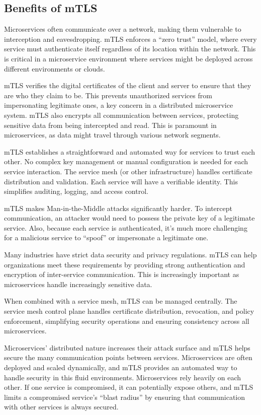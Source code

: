 \subsection{Benefits of mTLS}

Microservices often communicate over a network, making them vulnerable
to interception and eavesdropping. mTLS enforces a ``zero trust'' model,
where every service must authenticate itself regardless of its location
within the network. This is critical in a microservice environment where
services might be deployed across different environments or clouds.

mTLS verifies the digital certificates of the client and server to
ensure that they are who they claim to be. This prevents unauthorized
services from impersonating legitimate ones, a key concern in a
distributed microservice system. mTLS also encrypts all communication
between services, protecting sensitive data from being intercepted and
read. This is paramount in microservices, as data might travel through
various network segments.

mTLS establishes a straightforward and automated way for services to
trust each other. No complex key management or manual configuration is
needed for each service interaction. The service mesh (or other
infrastructure) handles certificate distribution and validation. Each
service will have a verifiable identity. This simplifies auditing,
logging, and access control.

mTLS makes Man-in-the-Middle attacks significantly harder. To intercept
communication, an attacker would need to possess the private key of a
legitimate service. Also, because each service is authenticated, it's
much more challenging for a malicious service to ``spoof'' or impersonate a
legitimate one.

Many industries have strict data security and privacy regulations. mTLS
can help organizations meet these requirements by providing strong
authentication and encryption of inter-service communication. This is
increasingly important as microservices handle increasingly sensitive
data.

When combined with a service mesh, mTLS can be managed centrally. The
service mesh control plane handles certificate distribution, revocation,
and policy enforcement, simplifying security operations and ensuring
consistency across all microservices.

Microservices' distributed nature increases their attack surface and
mTLS helps secure the many communication points between services.
Microservices are often deployed and scaled dynamically, and mTLS
provides an automated way to handle security in this fluid
environments. Microservices rely heavily on each other. If one service
is compromised, it can potentially expose others, and mTLS limits a
compromised service's ``blast radius'' by ensuring that communication
with other services is always secured.

